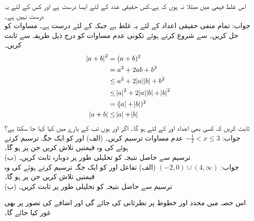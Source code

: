 اس غلط فہمی میں مبتلا نہ ہوں کہ  ہے۔کس حقیقی عدد  کے لئے ایسا درست ہے اور کس کے لئے یہ درست نہیں ہے۔\\
جواب:\quad
تمام منفی حقیقی اعداد کے لئے یہ غلط ہے جبکہ  کے لئے درست ہے۔
مساوات  کو حل کریں۔
  سے شروع کرتے ہوئے تکونی عدم مساوات کو درج ذیل طریقہ سے ثابت کریں۔
\begin{align*}
\abs{a+b}^2&=(a+b)^2\\
&=a^2+2ab+b^2\\
&\le a^2+2\abs{a}\abs{b}+b^2\\
&\le \abs{a}^2+2\abs{a}\abs{b}+\abs{b}^2\\
&=(\abs{a}+\abs{b})^2\\
\abs{a+b}&\le \abs{a}+\abs{b}
\end{align*}
ثابت کریں کہ کسی بھی اعداد  اور  کے لئے   ہو گا۔
اگر  اور  ہوں تب  کے بارے میں کیا کہا جا سکتا ہے؟\\
جواب:\quad
$-\tfrac{1}{2}<x\le 3$
عدم مساوات  ترسیم کریں۔
(الف) \quad {} اور  کو ایک جگہ ترسیم کرتے ہوئے  کی وہ قیمتیں تلاش کریں جن پر  ہو گا۔\\
(ب) \quad
ترسیم سے حاصل نتیجہ کو تحلیلی طور پر دوبارہ ثابت کریں۔ \\
جواب:\quad
$(-2,0)\cup (4,\infty)$
(الف) \quad
تفاعل  اور  کو ایک جگہ ترسیم کرتے ہوئے  کی وہ قیمتیں تلاش کریں جن پر  ہو گا۔\\
(ب)\quad
ترسیم سے حاصل نتیجہ کو تحلیلی طور پر ثابت کریں۔

اس حصہ میں محدد اور خطوط پر نظرثانی کی جائے گی اور اضافے کی تصور پر بھی غور کیا جائے گا۔

